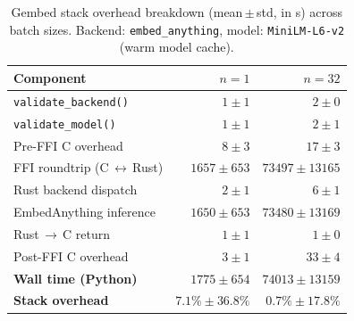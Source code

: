 \begin{table}[t]
  \centering
  \small
  \caption{Gembed stack overhead breakdown (mean\,$\pm$\,std, in \textmu{}s)           across batch sizes. Backend: \texttt{embed\_anything},           model: \texttt{MiniLM\mbox{-}L6\mbox{-}v2} (warm model cache).}
  \label{tab:gembed_overhead}
  \begin{tabular}{lrr}
    \toprule
    \textbf{Component} & $n=1$ & $n=32$ \\
    \midrule
    \texttt{validate\_backend()} & $1\pm1$ & $2\pm0$ \\
    \texttt{validate\_model()} & $1\pm1$ & $2\pm1$ \\
    Pre-FFI C overhead & $8\pm3$ & $17\pm3$ \\
    FFI roundtrip (C\,$\leftrightarrow$\,Rust) & $1657\pm653$ & $73497\pm13165$ \\
    Rust backend dispatch & $2\pm1$ & $6\pm1$ \\
    EmbedAnything inference & $1650\pm653$ & $73480\pm13169$ \\
    Rust\,$\to$\,C return & $1\pm1$ & $1\pm0$ \\
    Post-FFI C overhead & $3\pm1$ & $33\pm4$ \\
    \midrule
    \textbf{Wall time (Python)} & $1775\pm654$ & $74013\pm13159$ \\
    \midrule
    \textbf{Stack overhead} & $7.1\%\pm36.8\%$ & $0.7\%\pm17.8\%$ \\
    \bottomrule
  \end{tabular}
\end{table}
